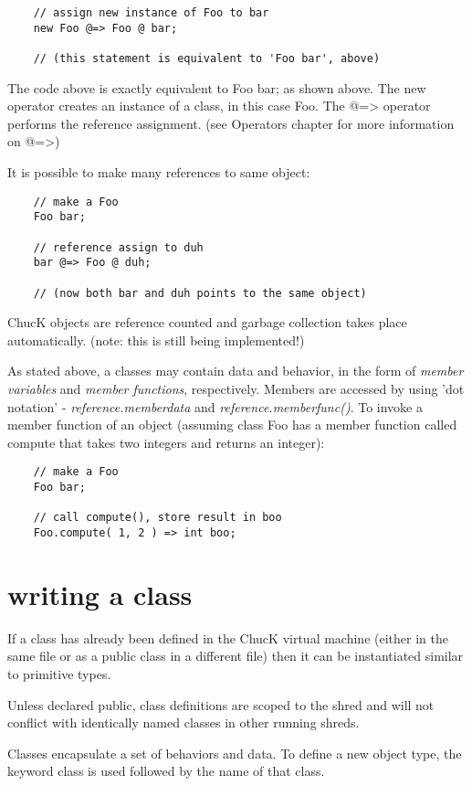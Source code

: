 \begin{verbatim}
    // assign new instance of Foo to bar
    new Foo @=> Foo @ bar;

    // (this statement is equivalent to 'Foo bar', above)
\end{verbatim}

The code above is exactly equivalent to Foo bar; as shown above. The new operator creates an instance of a class, in this case Foo. The @=> operator performs the reference assignment. (see Operators chapter for more information on @=>)

It is possible to make many references to same object:
\begin{verbatim}
    // make a Foo
    Foo bar;

    // reference assign to duh
    bar @=> Foo @ duh;

    // (now both bar and duh points to the same object)
\end{verbatim}
ChucK objects are reference counted and garbage collection takes place automatically. (note: this is still being implemented!)

As stated above, a classes may contain data and behavior, in the form of {\it member variables} and {\it member functions}, respectively. Members are accessed by using 'dot notation' - {\it reference.memberdata} and {\it reference.memberfunc()}. To invoke a member function of an object (assuming class Foo has a member function called compute that takes two integers and returns an integer):
\begin{verbatim}
    // make a Foo
    Foo bar;

    // call compute(), store result in boo
    Foo.compute( 1, 2 ) => int boo;
\end{verbatim}

\section{writing a class}

If a class has already been defined in the ChucK virtual machine (either in the same file or as a public class in a different file) then it can be instantiated similar to primitive types.

Unless declared public, class definitions are scoped to the shred and will not conflict with identically named classes in other running shreds.

Classes encapsulate a set of behaviors and data. To define a new object type, the keyword class is used followed by the name of that class.

